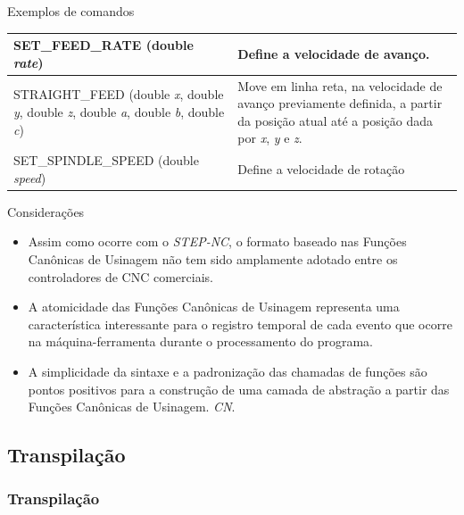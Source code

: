 \documentclass[aspectratio=169]{beamer}
\begin{document}
{\begin{frame}{Exemplos de comandos}
\begin{table}[H]
\begin{tabular}{p{7cm}|p{5cm}}
      \hline  
      \scriptsize{SET\_FEED\_RATE (double \emph{rate})}
      & \scriptsize{Define a velocidade de avan\c co.} \\

      \hline  
      \scriptsize{STRAIGHT\_FEED (double \emph{x}, double \emph{y}, double \emph{z}, 
      double \emph{a}, double \emph{b}, double \emph{c})} 
      & \scriptsize{Move em linha reta, na velocidade de avan\c co previamente definida, 
      a partir da posi\c c\~ao atual at\'e a 
      posi\c c\~ao dada por \emph{x}, \emph{y} e \emph{z}.} \\

      \hline  
      \scriptsize{SET\_SPINDLE\_SPEED (double \emph{speed})} 
      & \scriptsize{Define a velocidade de rotação} \\

      \hline

    \end{tabular}
  \end{table}
\end{frame}


\begin{frame}{Considerações}

  \begin{itemize}
    \item Assim como ocorre com o \emph{STEP-NC}, o formato baseado nas 
          Funções Canônicas de Usinagem não tem sido amplamente adotado 
          entre os controladores de CNC comerciais.
    \item A atomicidade das Funções Canônicas de Usinagem representa uma 
          característica interessante para o registro temporal de cada 
          evento que ocorre na máquina-ferramenta durante o processamento 
          do programa.
    \item A simplicidade da sintaxe e a padronização das chamadas de 
          funções são pontos positivos para a construção de uma camada 
          de abstração a partir das Funções Canônicas de Usinagem.
    \emph{CN}.

  \end{itemize}

\end{frame}


\subsection{Transpilação}

\begin{frame}
  \frametitle{Transpilação}


\end{frame}}
\end{document}
